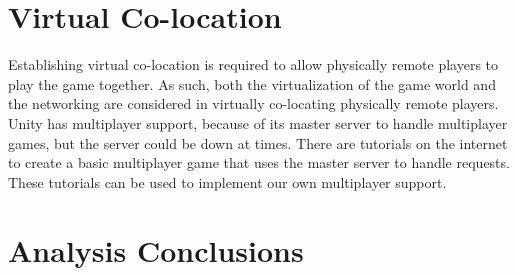 	\section{Virtual Co-location} \label{sec:virtualcolocation}
		Establishing virtual co-location is required to allow physically remote players
		to play the game together. As such, both the virtualization of the game world and
		the networking are considered in virtually co-locating physically remote players.
		Unity has multiplayer support, because of its master server to handle multiplayer
		games, but the server could be down at times. There are tutorials on the internet
		to create a basic multiplayer game that uses the master server to handle requests.
		These tutorials can be used to implement our own multiplayer support.

	\section{Analysis Conclusions} \label{sec:analysisconclusion}
		
